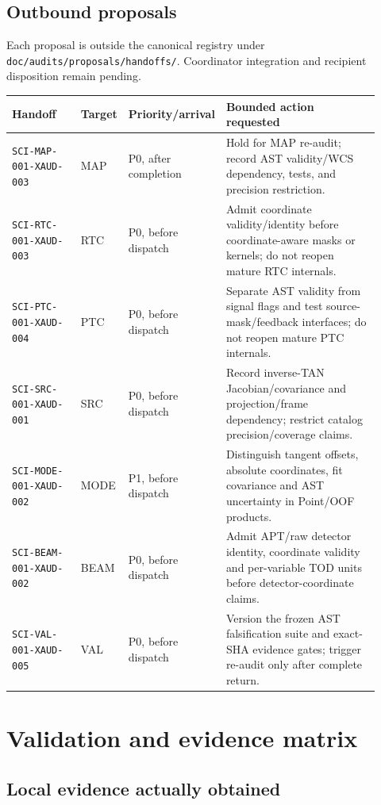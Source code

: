 \documentclass[11pt]{article}
\newcommand{\code}[1]{\nolinkurl{#1}}
\begin{document}
\subsection{Outbound proposals}

Each proposal is outside the canonical registry under
\code{doc/audits/proposals/handoffs/}. Coordinator integration and recipient
disposition remain pending.

\begin{longtable}{L{0.20\linewidth}L{0.12\linewidth}L{0.14\linewidth}L{0.46\linewidth}}
\toprule
Handoff & Target & Priority/arrival & Bounded action requested \\
\midrule
\endhead
\code{SCI-MAP-001-XAUD-003} & MAP & P0, after completion & Hold for MAP re-audit; record AST validity/WCS dependency, tests, and precision restriction. \\
\code{SCI-RTC-001-XAUD-003} & RTC & P0, before dispatch & Admit coordinate validity/identity before coordinate-aware masks or kernels; do not reopen mature RTC internals. \\
\code{SCI-PTC-001-XAUD-004} & PTC & P0, before dispatch & Separate AST validity from signal flags and test source-mask/feedback interfaces; do not reopen mature PTC internals. \\
\code{SCI-SRC-001-XAUD-001} & SRC & P0, before dispatch & Record inverse-TAN Jacobian/covariance and projection/frame dependency; restrict catalog precision/coverage claims. \\
\code{SCI-MODE-001-XAUD-002} & MODE & P1, before dispatch & Distinguish tangent offsets, absolute coordinates, fit covariance and AST uncertainty in Point/OOF products. \\
\code{SCI-BEAM-001-XAUD-002} & BEAM & P0, before dispatch & Admit APT/raw detector identity, coordinate validity and per-variable TOD units before detector-coordinate claims. \\
\code{SCI-VAL-001-XAUD-005} & VAL & P0, before dispatch & Version the frozen AST falsification suite and exact-SHA evidence gates; trigger re-audit only after complete return. \\
\bottomrule
\end{longtable}

\section{Validation and evidence matrix}

\subsection{Local evidence actually obtained}
\end{document}
